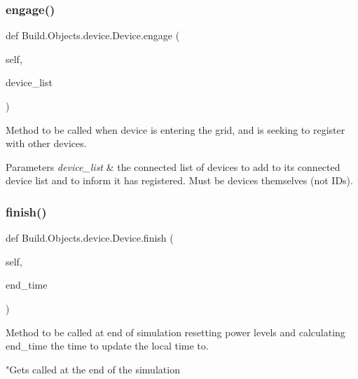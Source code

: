 \subsubsection{\texorpdfstring{engage()}{engage()}}
{\footnotesize\ttfamily def Build.\+Objects.\+device.\+Device.\+engage (\begin{DoxyParamCaption}\item[{}]{self,  }\item[{}]{device\+\_\+list }\end{DoxyParamCaption})}



Method to be called when device is entering the grid, and is seeking to register with other devices. 


\begin{DoxyParams}{Parameters}
{\em device\+\_\+list} & the connected list of devices to add to its connected device list and to inform it has registered. Must be devices themselves (not ID\textquotesingle{}s). \\
\hline
\end{DoxyParams}
\mbox{\label{class_build_1_1_objects_1_1device_1_1_device_a0eb251de12fe74493c71a50713b5ac3a}} 
\subsubsection{\texorpdfstring{finish()}{finish()}}
{\footnotesize\ttfamily def Build.\+Objects.\+device.\+Device.\+finish (\begin{DoxyParamCaption}\item[{}]{self,  }\item[{}]{end\+\_\+time }\end{DoxyParamCaption})}



Method to be called at end of simulation resetting power levels and calculating end\+\_\+time the time to update the local time to. 

\begin{DoxyVerb}"Gets called at the end of the simulation\end{DoxyVerb}
 \mbox{\label{class_build_1_1_objects_1_1device_1_1_device_a9cf14b880ef9cf103ba68554d3653593}} 
